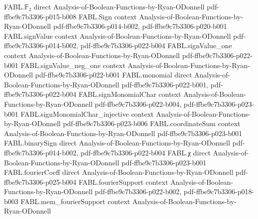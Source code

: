 \begin{theorem}
\label{FABL.subsetDensity_binaryAffineSubspace_apply}
\leanok
{}
\proofstep
  {FABL.𝔽₂}
  {direct}
  {Analysis-of-Boolean-Functions-by-Ryan-ODonnell}
  {pdf-ffbe9c7b3306-p015-b008}
\proofstep
  {FABL.Sign}
  {context}
  {Analysis-of-Boolean-Functions-by-Ryan-ODonnell}
  {pdf-ffbe9c7b3306-p014-b002,
    pdf-ffbe9c7b3306-p020-b001}
\proofstep
  {FABL.signValue}
  {context}
  {Analysis-of-Boolean-Functions-by-Ryan-ODonnell}
  {pdf-ffbe9c7b3306-p014-b002,
    pdf-ffbe9c7b3306-p022-b004}
\proofstep
  {FABL.signValue_one}
  {context}
  {Analysis-of-Boolean-Functions-by-Ryan-ODonnell}
  {pdf-ffbe9c7b3306-p022-b001}
\proofstep
  {FABL.signValue_neg_one}
  {context}
  {Analysis-of-Boolean-Functions-by-Ryan-ODonnell}
  {pdf-ffbe9c7b3306-p022-b001}
\proofstep
  {FABL.monomial}
  {direct}
  {Analysis-of-Boolean-Functions-by-Ryan-ODonnell}
  {pdf-ffbe9c7b3306-p022-b001,
    pdf-ffbe9c7b3306-p022-b004}
\proofstep
  {FABL.signMonomialChar}
  {context}
  {Analysis-of-Boolean-Functions-by-Ryan-ODonnell}
  {pdf-ffbe9c7b3306-p022-b004,
    pdf-ffbe9c7b3306-p023-b001}
\proofstep
  {FABL.signMonomialChar_injective}
  {context}
  {Analysis-of-Boolean-Functions-by-Ryan-ODonnell}
  {pdf-ffbe9c7b3306-p023-b006}
\proofstep
  {FABL.coordinateSum}
  {context}
  {Analysis-of-Boolean-Functions-by-Ryan-ODonnell}
  {pdf-ffbe9c7b3306-p023-b001}
\proofstep
  {FABL.binarySign}
  {direct}
  {Analysis-of-Boolean-Functions-by-Ryan-ODonnell}
  {pdf-ffbe9c7b3306-p014-b002,
    pdf-ffbe9c7b3306-p022-b004}
\proofstep
  {FABL.χ}
  {direct}
  {Analysis-of-Boolean-Functions-by-Ryan-ODonnell}
  {pdf-ffbe9c7b3306-p023-b001}
\proofstep
  {FABL.fourierCoeff}
  {direct}
  {Analysis-of-Boolean-Functions-by-Ryan-ODonnell}
  {pdf-ffbe9c7b3306-p025-b004}
\proofstep
  {FABL.fourierSupport}
  {context}
  {Analysis-of-Boolean-Functions-by-Ryan-ODonnell}
  {pdf-ffbe9c7b3306-p022-b002,
    pdf-ffbe9c7b3306-p018-b003}
\proofstep
  {FABL.mem_fourierSupport}
  {context}
  {Analysis-of-Boolean-Functions-by-Ryan-ODonnell}

\end{theorem}
